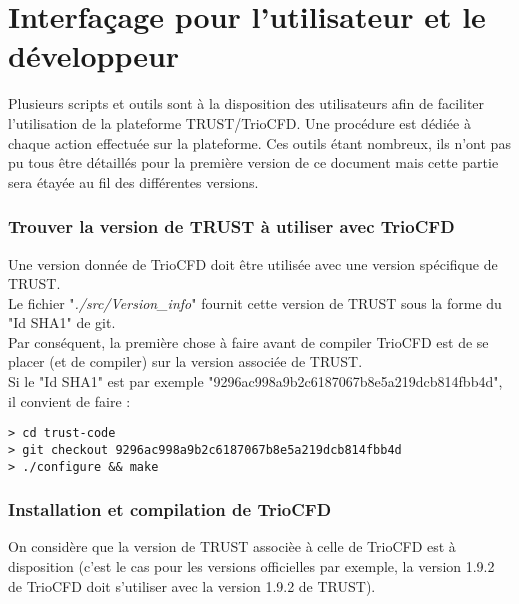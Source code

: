 
\chapter{Interfa\c cage pour l'utilisateur et le d\'eveloppeur}
Plusieurs scripts et outils sont à la disposition des utilisateurs afin de faciliter l'utilisation de la plateforme TRUST/TrioCFD. Une procédure est dédiée à chaque action effectuée sur la plateforme. Ces outils étant nombreux, ils n'ont pas pu tous être détaillés pour la première version de ce document mais cette partie sera étayée au fil des différentes versions.

\subsection{Trouver la version de TRUST \`a utiliser avec TrioCFD}
\label{subsec:versionTRUST}

Une version donn\'ee de TrioCFD doit \^etre utilis\'ee avec une version sp\'ecifique de TRUST.\\

Le fichier "\emph{./src/Version\_info}" fournit cette version de TRUST sous la forme du "Id SHA1" de git.\\

Par cons\'equent, la premi\`ere chose \`a faire avant de compiler TrioCFD est de se placer (et de compiler)
sur la version associ\'ee de TRUST.\\

Si le "Id SHA1" est par exemple "9296ac998a9b2c6187067b8e5a219dcb814fbb4d", il convient de faire :
\begin{lstlisting}
> cd trust-code
> git checkout 9296ac998a9b2c6187067b8e5a219dcb814fbb4d
> ./configure && make
\end{lstlisting}

\subsection{Installation et compilation de TrioCFD}
\label{subsec:install}

On consid\`ere que la version de TRUST associ\`ee \`a celle de TrioCFD est \`a disposition
(c'est le cas pour les versions officielles par exemple, la version 1.9.2 de TrioCFD
doit s'utiliser avec la version 1.9.2 de TRUST).\\

